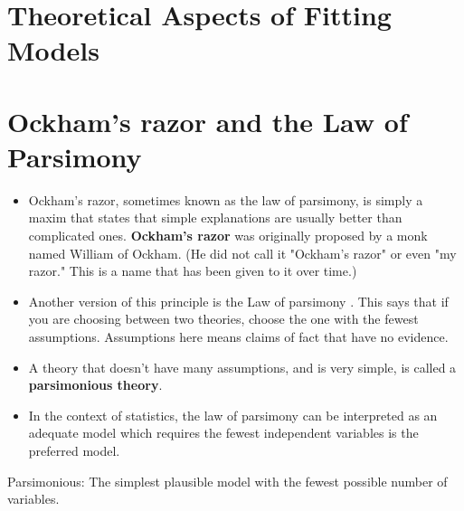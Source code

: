 \documentclass[a4paper,12pt]{article}
\begin{document}
\section*{Theoretical Aspects of Fitting Models}

\section*{Ockham's razor and the Law of Parsimony}
\begin{itemize}
	\item Ockham's razor, sometimes known as the law of parsimony, is simply a maxim that states that simple explanations are usually better than complicated ones. \textbf{Ockham's razor} was originally proposed by a monk named William of Ockham. (He did not call it "Ockham's razor" or even "my razor." This is a name that has been given to it over time.)
	
\item Another version of this principle is the Law of parsimony . This says that if you are choosing between two theories, choose the one with the fewest assumptions. Assumptions here means claims of fact that have no evidence.
\item A theory that doesn't have many assumptions, and is very simple, is called a \textbf{parsimonious theory}.
	
\item In the context of statistics, the law of parsimony can be interpreted as an adequate model which requires the fewest independent variables is the preferred model.
\end{itemize}

\begin{framed}
	Parsimonious: The simplest plausible model with the fewest possible number of variables.
\end{framed}
\end{document}
